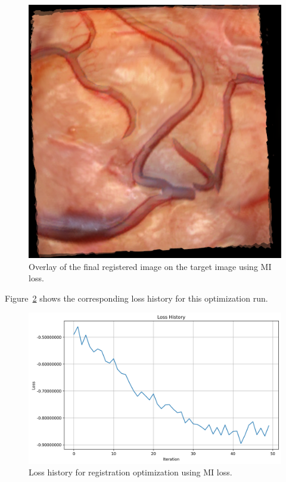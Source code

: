 \begin{figure}[htpb]
  \centering
  \includegraphics[scale=0.5]{figures/mi/alignment_overlay.png}
  \caption[Registration result with MI loss]{Overlay of the final registered image on the target image using MI loss.}
  \label{fig:mi_overlay}
\end{figure}

Figure~\ref{fig:mi_history} shows the corresponding loss history for this optimization run.

\begin{figure}[htpb]
  \centering
  \includegraphics[scale=0.65]{figures/mi/loss_history.png}
  \caption[Loss history for MI optimization]{Loss history for registration optimization using MI loss.}
  \label{fig:mi_history}
\end{figure}

